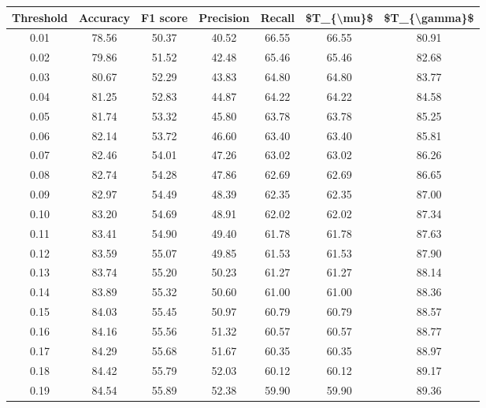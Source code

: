 \begin{tabular}{|c|c|c|c|c|c|c|}
\hline
 Threshold &  Accuracy &  F1 score &  Precision &  Recall &  \$T\_\{\textbackslash mu\}\$ &  \$T\_\{\textbackslash gamma\}\$ \\
\hline
      0.01 &     78.56 &     50.37 &      40.52 &   66.55 &      66.55 &         80.91 \\
      0.02 &     79.86 &     51.52 &      42.48 &   65.46 &      65.46 &         82.68 \\
      0.03 &     80.67 &     52.29 &      43.83 &   64.80 &      64.80 &         83.77 \\
      0.04 &     81.25 &     52.83 &      44.87 &   64.22 &      64.22 &         84.58 \\
      0.05 &     81.74 &     53.32 &      45.80 &   63.78 &      63.78 &         85.25 \\
      0.06 &     82.14 &     53.72 &      46.60 &   63.40 &      63.40 &         85.81 \\
      0.07 &     82.46 &     54.01 &      47.26 &   63.02 &      63.02 &         86.26 \\
      0.08 &     82.74 &     54.28 &      47.86 &   62.69 &      62.69 &         86.65 \\
      0.09 &     82.97 &     54.49 &      48.39 &   62.35 &      62.35 &         87.00 \\
      0.10 &     83.20 &     54.69 &      48.91 &   62.02 &      62.02 &         87.34 \\
      0.11 &     83.41 &     54.90 &      49.40 &   61.78 &      61.78 &         87.63 \\
      0.12 &     83.59 &     55.07 &      49.85 &   61.53 &      61.53 &         87.90 \\
      0.13 &     83.74 &     55.20 &      50.23 &   61.27 &      61.27 &         88.14 \\
      0.14 &     83.89 &     55.32 &      50.60 &   61.00 &      61.00 &         88.36 \\
      0.15 &     84.03 &     55.45 &      50.97 &   60.79 &      60.79 &         88.57 \\
      0.16 &     84.16 &     55.56 &      51.32 &   60.57 &      60.57 &         88.77 \\
      0.17 &     84.29 &     55.68 &      51.67 &   60.35 &      60.35 &         88.97 \\
      0.18 &     84.42 &     55.79 &      52.03 &   60.12 &      60.12 &         89.17 \\
      0.19 &     84.54 &     55.89 &      52.38 &   59.90 &      59.90 &         89.36 \\

\end{tabular}
